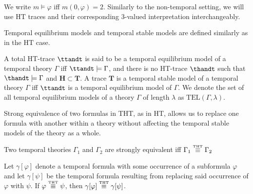 We write $m \models \varphi$ iff $m(0,\varphi)=2$. Similarly to the
non-temporal setting, we will use HT traces and their corresponding
3-valued interpretation interchangeably.

Temporal equilibrium models and temporal stable models are defined
similarly as in the HT case.

\begin{definition}
  A total HT-trace $\ttandt$ is said to be a temporal equilibrium
  model of a temporal theory $\Gamma$ iff $\ttandt \models \Gamma$,
  and there is no HT-trace $\thandt$ such that
  $\thandt \models \Gamma$ and $\bm{H} \subset \bm{T}$. A trace
  $\bm{T}$ is a temporal stable model of a temporal theory $\Gamma$
  iff $\ttandt$ is a temporal equilibrium model of $\Gamma$. We denote
  the set of all temporal equilibrium models of a theory $\Gamma$ of length $\lambda$
  as $\text{TEL}(\Gamma,\lambda)$.
\end{definition}

Strong equivalence of two formulas in THT, as in HT, allows us to
replace one formula with another within a theory without affecting the
temporal stable models of the theory as a whole.

\begin{proposition}
  Two temporal theories $\Gamma_1$ and $\Gamma_2$ are strongly equivalent
  iff $\Gamma_1 \stackrel{\normalfont\mbox{\tiny THT}}{\equiv} \Gamma_2$
\end{proposition}

\begin{proposition}
  Let $\gamma[\varphi]$ denote a temporal formula with some occurrence of a
  subformula $\varphi$ and let $\gamma[\psi]$ be the temporal formula resulting
  from replacing said occurrence of $\varphi$ with $\psi$. If
  $\varphi \stackrel{\normalfont\mbox{\tiny THT}}{\equiv} \psi$, then $\gamma[\varphi] \stackrel{\normalfont\mbox{\tiny THT}}{\equiv} \gamma[\psi]$.
\end{proposition}
